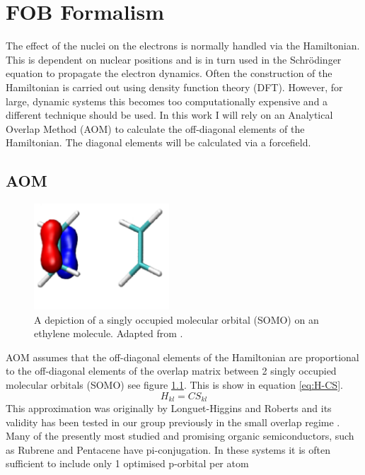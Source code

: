 
\chapter{FOB Formalism}
\label{chap:FOB}
The effect of the nuclei on the electrons is normally handled via the Hamiltonian. This is dependent on nuclear positions and is in turn used in the Schr\"odinger equation to propagate the electron dynamics. Often the construction of the Hamiltonian is carried out using density function theory (DFT). However, for large, dynamic systems this becomes too computationally expensive and a different technique should be used. In this work I will rely on an Analytical Overlap Method (AOM) \cite{gajdos_ultrafast_2014} to calculate the off-diagonal elements of the Hamiltonian. The diagonal elements will be calculated via a forcefield.
\section{AOM}
\begin{figure}
  \includegraphics[width=0.45\textwidth]{./img/SOMO.png}
  \caption{\label{fig:SOMO}A depiction of a singly occupied molecular orbital (SOMO) on an ethylene molecule. Adapted from \cite{spencer_fob-sh:_2016}.}
\end{figure}
AOM assumes that the off-diagonal elements of the Hamiltonian are proportional to the off-diagonal elements of the overlap matrix between 2 singly occupied molecular orbitals (SOMO) see figure \ref{fig:SOMO}. This is show in equation \eqref{eq:H-CS}.
\begin{equation}
    H_{kl} = C S_{kl}
    \label{eq:H-CS}
\end{equation}
This approximation was originally by Longuet-Higgins and Roberts \cite{Prezhdo1997Oct} and its validity has been tested in our group previously in the small overlap regime \cite{gajdos_ultrafast_2014}.  Many of the presently most studied and promising organic semiconductors, such as Rubrene \cite{Braga2009Feb,Baris2014Aug} and Pentacene \cite{Tiwari2010May, Kim2015Dec} have pi-conjugation. In these systems it is often sufficient to include only 1 optimised p-orbital per atom
